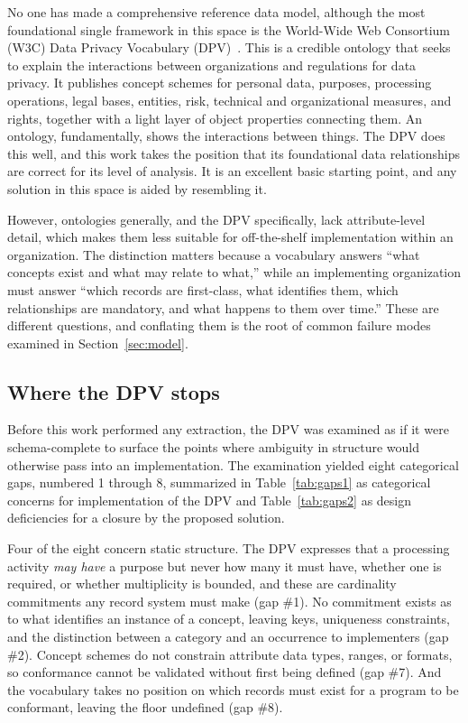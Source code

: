 \documentclass[10pt,letterpaper,twocolumn,twoside]{rho-class/rho}
\begin{document}
No one has made a comprehensive reference data model, although the most foundational single framework in this space is the World-Wide Web Consortium (W3C) Data Privacy Vocabulary (DPV)~\cite{dpv}. This is a credible ontology that seeks to explain the interactions between organizations and regulations for data privacy. It publishes concept schemes for personal data, purposes, processing operations, legal bases, entities, risk, technical and organizational measures, and rights, together with a light layer of object properties connecting them. An ontology, fundamentally, shows the interactions between things. The DPV does this well, and this work takes the position that its foundational data relationships are correct for its level of analysis. It is an excellent basic starting point, and any solution in this space is aided by resembling it.

However, ontologies generally, and the DPV specifically, lack attribute-level detail, which makes them less suitable for off-the-shelf implementation within an organization. The distinction matters because a vocabulary answers ``what concepts exist and what may relate to what,'' while an implementing organization must answer ``which records are first-class, what identifies them, which relationships are mandatory, and what happens to them over time.'' These are different questions, and conflating them is the root of common failure modes examined in Section~\ref{sec:model}.

\subsection{Where the DPV stops}\label{sec:dpvstops}

Before this work performed any extraction, the DPV was examined as if it were schema-complete to surface the points where ambiguity in structure would otherwise pass into an implementation. The examination yielded eight categorical gaps, numbered 1 through 8, summarized in Table~\ref{tab:gaps1} as categorical concerns for implementation of the DPV and Table~\ref{tab:gaps2} as design deficiencies for a closure by the proposed solution.

Four of the eight concern static structure. The DPV expresses that a processing activity \emph{may have} a purpose but never how many it must have, whether one is required, or whether multiplicity is bounded, and these are cardinality commitments any record system must make (gap \#1). No commitment exists as to what identifies an instance of a concept, leaving keys, uniqueness constraints, and the distinction between a category and an occurrence to implementers (gap \#2). Concept schemes do not constrain attribute data types, ranges, or formats, so conformance cannot be validated without first being defined (gap \#7). And the vocabulary takes no position on which records must exist for a program to be conformant, leaving the floor undefined (gap \#8).
\end{document}
